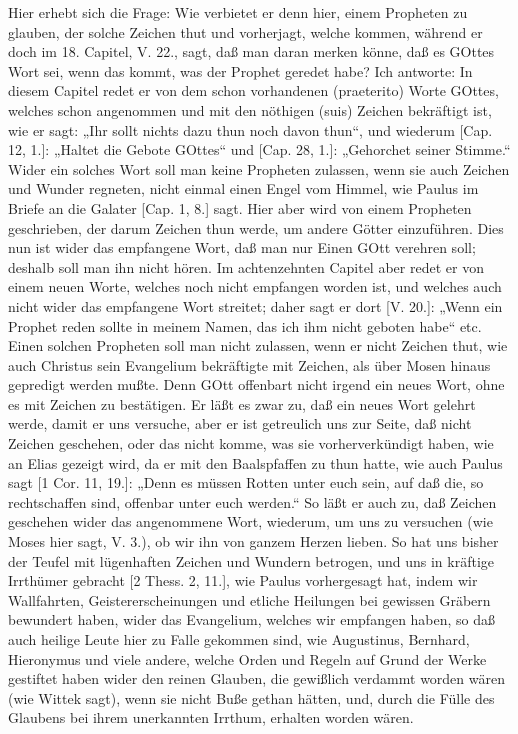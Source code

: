 Hier erhebt sich die Frage: Wie verbietet er denn hier, einem Propheten zu glauben, der solche Zeichen thut und vorherjagt, welche kommen, während er doch im 18. Capitel, V. 22., sagt, daß man daran merken könne, daß es GOttes Wort sei, wenn das kommt, was der Prophet geredet habe? Ich antworte: In diesem
Capitel redet er von dem schon vorhandenen (praeterito) Worte GOttes, welches schon angenommen und mit den nöthigen (suis) Zeichen bekräftigt ist, wie er sagt: „Ihr sollt nichts dazu thun noch davon thun“, und wiederum [Cap. 12, 1.]: „Haltet die Gebote GOttes“ und [Cap. 28, 1.]: „Gehorchet seiner Stimme.“ Wider ein solches Wort soll man keine Propheten zulassen, wenn sie auch Zeichen und Wunder regneten, nicht einmal einen Engel vom Himmel, wie Paulus im Briefe an die Galater [Cap. 1, 8.] sagt. Hier aber wird von einem Propheten geschrieben, der darum Zeichen thun werde, um andere Götter einzuführen. Dies nun ist wider das empfangene Wort, daß man nur Einen GOtt verehren soll; deshalb soll man ihn nicht hören. Im achtenzehnten Capitel aber redet er von einem neuen Worte, welches noch nicht empfangen worden ist, und welches auch nicht wider das empfangene Wort streitet; daher sagt er dort [V. 20.]: „Wenn ein Prophet reden sollte in meinem Namen, das ich ihm nicht geboten habe“ etc. Einen solchen Propheten soll man nicht zulassen, wenn er nicht Zeichen thut, wie auch Christus sein Evangelium bekräftigte mit Zeichen, als über Mosen hinaus gepredigt werden mußte. Denn GOtt offenbart nicht irgend ein neues Wort, ohne es mit Zeichen zu bestätigen. Er läßt es zwar zu, daß ein neues Wort gelehrt werde, damit er uns versuche, aber er ist getreulich uns zur Seite, daß nicht Zeichen geschehen, oder das nicht komme, was sie vorherverkündigt haben, wie an Elias gezeigt wird, da er mit den Baalspfaffen zu thun hatte, wie auch Paulus sagt [1 Cor. 11, 19.]: „Denn es müssen Rotten unter euch sein, auf daß die, so rechtschaffen sind, offenbar unter euch werden.“ So läßt er auch zu, daß Zeichen geschehen wider das angenommene Wort, wiederum, um uns zu versuchen (wie Moses hier sagt, V. 3.), ob wir ihn von ganzem Herzen lieben. So hat uns bisher der Teufel mit lügenhaften Zeichen und Wundern betrogen, und uns in kräftige Irrthümer gebracht [2 Thess. 2, 11.], wie Paulus vorhergesagt hat, indem wir Wallfahrten, Geistererscheinungen und etliche Heilungen bei gewissen Gräbern bewundert haben, wider das Evangelium, welches wir empfangen haben, so daß auch heilige Leute hier zu Falle gekommen sind, wie Augustinus, Bernhard, Hieronymus und viele andere, welche Orden und Regeln auf Grund der Werke gestiftet haben wider den reinen Glauben, die gewißlich verdammt worden wären (wie Wittek sagt), wenn sie nicht Buße gethan hätten, und, durch die Fülle des Glaubens bei ihrem unerkannten Irrthum, erhalten worden wären.

